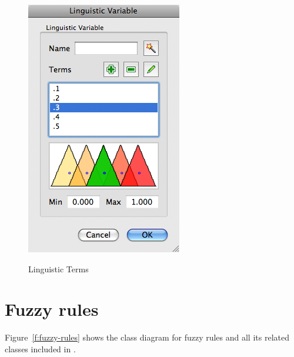 \begin{figure}[ht]
			{\includegraphics[scale=0.4]
			{./figures/ft-partition-1.png}}
			\caption{Linguistic Terms}
			\label{f:lterms}
		\end{figure}
		
	\section{Fuzzy rules}
		Figure~\ref{f:fuzzy-rules} shows the class diagram for fuzzy rules and all its related classes included in \fl.
		
